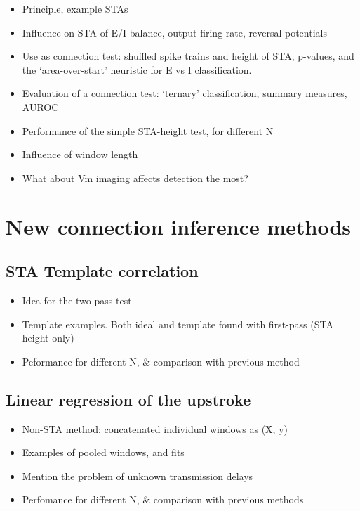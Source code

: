 \documentclass[a4paper, oneside, 11pt]{memoir}
\begin{document}
\begin{itemize}
    \item Principle, example STAs
    \item Influence on STA of E/I balance, output firing rate, reversal potentials
    \item Use as connection test: shuffled spike trains and height of STA, p-values, and the `area-over-start' heuristic for E vs I classification.
    \item Evaluation of a connection test: `ternary' classification, summary measures, AUROC
    \item Performance of the simple STA-height test, for different N
    \item Influence of window length
    \item What about Vm imaging affects detection the most?
\end{itemize}


\chapter{New connection inference methods}

\section{STA Template correlation}

\begin{itemize}
    \item Idea for the two-pass test
    \item Template examples. Both ideal and template found with first-pass (STA height-only)
    \item Peformance for different N, \& comparison with previous method
\end{itemize}


\section{Linear regression of the upstroke}

\begin{itemize}
    \item Non-STA method: concatenated individual windows as (X, y)
    \item Examples of pooled windows, and fits
    \item Mention the problem of unknown transmission delays
    \item Perfomance for different N, \& comparison with previous methods
\end{itemize}
\end{document}
